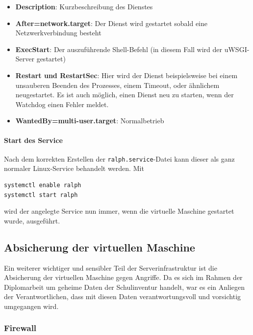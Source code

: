 \documentclass[
]{article}
\providecommand{\tightlist}{%
  \setlength{\itemsep}{0pt}\setlength{\parskip}{0pt}}
\begin{document}
\begin{itemize}
\tightlist
\item
  \textbf{Description}: Kurzbeschreibung des Dienstes
\item
  \textbf{After=network.target}: Der Dienst wird gestartet sobald eine
  Netzwerkverbindung besteht
\item
  \textbf{ExecStart}: Der auszuführende Shell-Befehl (in diesem Fall
  wird der uWSGI-Server gestartet)
\item
  \textbf{Restart und RestartSec}: Hier wird der Dienst beispielsweise
  bei einem unsauberen Beenden des Prozesses, einem Timeout, oder
  ähnlichem neugestartet. Es ist auch möglich, einen Dienst neu zu
  starten, wenn der Watchdog einen Fehler meldet.
\item
  \textbf{WantedBy=multi-user.target}: Normalbetrieb
\end{itemize}

\hypertarget{start-des-service}{%
\paragraph{Start des Service}\label{start-des-service}}

Nach dem korrekten Erstellen der \texttt{ralph.service}-Datei kann
dieser als ganz normaler Linux-Service behandelt werden. Mit

\begin{verbatim}
systemctl enable ralph
systemctl start ralph
\end{verbatim}

wird der angelegte Service nun immer, wenn die virtuelle Maschine
gestartet wurde, ausgeführt.

\hypertarget{absicherung-der-virtuellen-maschine}{%
\subsection{Absicherung der virtuellen
Maschine}\label{absicherung-der-virtuellen-maschine}}

Ein weiterer wichtiger und sensibler Teil der Serverinfrastruktur ist
die Absicherung der virtuellen Maschine gegen Angriffe. Da es sich im
Rahmen der Diplomarbeit um geheime Daten der Schulinventur handelt, war
es ein Anliegen der Verantwortlichen, dass mit diesen Daten
verantwortungsvoll und vorsichtig umgegangen wird.

\hypertarget{firewall}{%
\subsubsection{Firewall}\label{firewall}}
\end{document}
